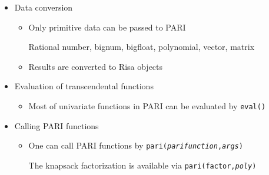 \begin{slide}{}

\begin{itemize}
\item Data conversion

\begin{itemize}

\item Only primitive data can be passed to PARI

Rational number, bignum, bigfloat, polynomial,
vector, matrix

\item Results are converted to Risa objects

\end{itemize}

\item Evaluation of transcendental functions

\begin{itemize}
\item Most of univariate functions in PARI can be 
evaluated by {\tt eval()}
\end{itemize}

\item Calling PARI functions

\begin{itemize}
\item One can call PARI functions by {\tt pari({\it parifunction},{\it args})}

The knapsack factorization is available via {\tt pari(factor,{\it poly})}
\end{itemize}
\end{itemize}
\end{slide}

\begin{slide}{}
\end{slide}

\begin{slide}{}
\end{slide}

\begin{slide}{}
\end{slide}

\begin{slide}{}
\end{slide}

